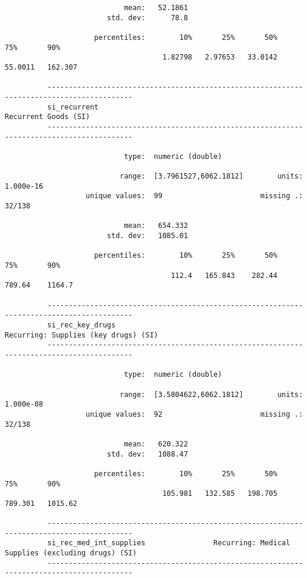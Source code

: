 \documentclass{article}
\begin{document}
\begin{verbatim}
                            mean:   52.1861
                        std. dev:      78.8
          
                     percentiles:        10%       25%       50%       75%       90%
                                     1.82798   2.97653   33.0142   55.0011   162.307
          
          ------------------------------------------------------------------------------------------
          si_recurrent                                                          Recurrent Goods (SI)
          ------------------------------------------------------------------------------------------
          
                            type:  numeric (double)
          
                           range:  [3.7961527,6062.1812]        units:  1.000e-16
                   unique values:  99                       missing .:  32/138
          
                            mean:   654.332
                        std. dev:   1085.01
          
                     percentiles:        10%       25%       50%       75%       90%
                                       112.4   165.843    282.44    789.64    1164.7
          
          ------------------------------------------------------------------------------------------
          si_rec_key_drugs                                      Recurring: Supplies (key drugs) (SI)
          ------------------------------------------------------------------------------------------
          
                            type:  numeric (double)
          
                           range:  [3.5804622,6062.1812]        units:  1.000e-08
                   unique values:  92                       missing .:  32/138
          
                            mean:   620.322
                        std. dev:   1088.47
          
                     percentiles:        10%       25%       50%       75%       90%
                                     105.981   132.585   198.705   789.301   1015.62
          
          ------------------------------------------------------------------------------------------
          si_rec_med_int_supplies                Recurring: Medical Supplies (excluding drugs) (SI)
          ------------------------------------------------------------------------------------------
          

\end{verbatim}
\end{document}
